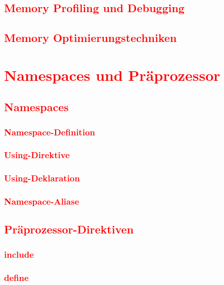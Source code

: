 \section{\textcolor{red}{Memory Profiling und Debugging}}\label{sec:memory-profiling}
\section{\textcolor{red}{Memory Optimierungstechniken}}\label{sec:memory-optimization}

\cleardoublepage\chapter{\textcolor{red}{Namespaces und Präprozessor}}\label{chap:namespaces-preprocessor}
\section{\textcolor{red}{Namespaces}}\label{sec:namespaces}
\subsection{\textcolor{red}{Namespace-Definition}}\label{sec:namespace-definition}
\subsection{\textcolor{red}{Using-Direktive}}\label{sec:using-directive}
\subsection{\textcolor{red}{Using-Deklaration}}\label{sec:using-declaration}
\subsection{\textcolor{red}{Namespace-Aliase}}\label{sec:namespace-aliases}
\section{\textcolor{red}{Präprozessor-Direktiven}}\label{sec:preprocessor}
\subsection{\textcolor{red}{include}}\label{sec:include}
\subsection{\textcolor{red}{define}}\label{sec:define}
